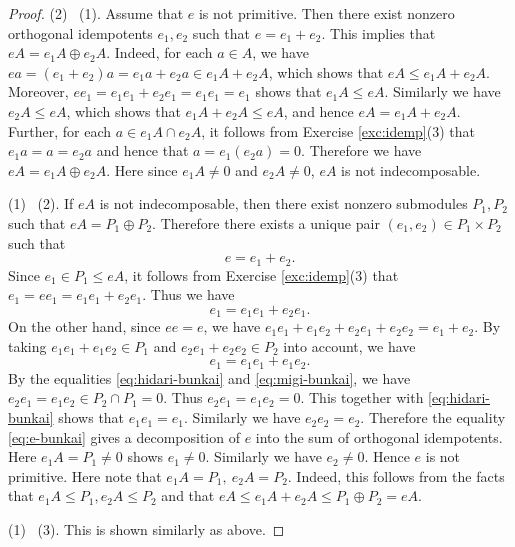 \documentclass{surv-l}
\numberwithin{equation}{chapter}
\numberwithin{figure}{chapter}
\theoremstyle{plain}
\theoremstyle{definition}
\theoremstyle{remark}
\begin{document}
\begin{proof}
(2) \text{$\Rightarrow$}\  (1).
Assume that $e$ is not primitive.
Then there exist nonzero orthogonal idempotents
$e_1, e_2$ such that $e = e_1 +e_2$.
This implies that $eA = e_1A \oplus e_2A$.
Indeed, for each $a \in A$, we have
$ea = (e_1 + e_2)a = e_1a + e_2a \in e_1A + e_2A$, which shows
that $eA \le e_1A + e_2A$.
Moreover,
$ee_1 = e_1e_1 +e_2e_1 = e_1e_1 = e_1$ shows that
$e_1A \le eA$. Similarly we have $e_2A \le eA$, which shows that
$e_1A + e_2A \le eA$, and hence $eA = e_1A + e_2A$.
Further, for each $a \in e_1A \cap e_2A$, it follows
from Exercise \ref{exc:idemp}(3) that
$e_1a = a = e_2a$ and hence that $a = e_1(e_2a) = 0$.
Therefore we have $eA = e_1A \oplus e_2A$.
Here since $e_1A \ne 0$ and $e_2A \ne 0$, $eA$ is not indecomposable.

(1) \text{$\Rightarrow$}\  (2).
If $eA$ is not indecomposable, then
there exist nonzero submodules $P_1, P_2$ such that
$eA = P_1 \oplus P_2$.
Therefore there exists a unique pair $(e_1, e_2) \in P_1 \times P_2$
such that
\begin{equation}\label{eq:e-bunkai}
 e = e_1 + e_2.
\end{equation}
Since $e_1\in P_1 \le eA$, it follows from Exercise \ref{exc:idemp}(3)
that $e_1 = ee_1= e_1e_1 + e_2e_1$.
Thus we have
\begin{equation}\label{eq:hidari-bunkai}
e_1 = e_1e_1 + e_2e_1.
\end{equation}
On the other hand, since $ee = e$,
we have $e_1e_1 +e_1e_2 + e_2e_1 + e_2e_2 = e_1 + e_2$.
By taking $e_1e_1 +e_1e_2 \in P_1$ and $e_2e_1 + e_2e_2 \in P_2$ into account,
we have
\begin{equation}\label{eq:migi-bunkai}
e_1 = e_1e_1 + e_1e_2.
\end{equation}
By the equalities \eqref{eq:hidari-bunkai} and \eqref{eq:migi-bunkai},
we have
$e_2e_1 = e_1e_2 \in P_2 \cap P_1 = 0$.
Thus $e_2e_1 = e_1e_2 = 0$.
This together with \eqref{eq:hidari-bunkai} shows that $e_1e_1 = e_1$.
Similarly we have $e_2e_2=e_2$.
Therefore the equality \eqref{eq:e-bunkai} gives a decomposition of $e$
into the sum of orthogonal idempotents.
Here $e_1A = P_1 \ne 0$ shows $e_1\ne 0$.
Similarly we have $e_2 \ne 0$.
Hence $e$ is not primitive.
Here note that $e_1A = P_1, \ e_2A = P_2$.
Indeed, this follows from the facts that
$e_1A \le P_1, e_2A \le P_2$ and that
$eA \le e_1A + e_2A \le P_1 \oplus P_2 = eA$.

(1) \text{$\Leftrightarrow$}\  (3).
This is shown similarly as above.
\end{proof}
\end{document}
